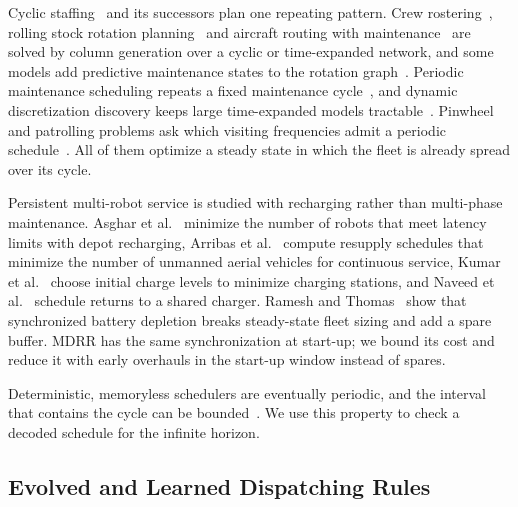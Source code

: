 Cyclic staffing~\cite{bartholdi1980cyclic} and its successors plan one repeating pattern.
Crew rostering~\cite{breugem2023threephase,feng2024branchprice}, rolling stock rotation planning~\cite{wang2024rollingstock} and aircraft routing with maintenance~\cite{he2023aircraft} are solved by column generation over a cyclic or time-expanded network, and some models add predictive maintenance states to the rotation graph~\cite{prause2024iterative}.
Periodic maintenance scheduling repeats a fixed maintenance cycle~\cite{maquirriain2024matheuristics}, and dynamic discretization discovery keeps large time-expanded models tractable~\cite{ojha2025crossdock}.
Pinwheel and patrolling problems ask which visiting frequencies admit a periodic schedule~\cite{kawamura2020patrolling,kawamura2026pinwheel}.
All of them optimize a steady state in which the fleet is already spread over its cycle.

Persistent multi-robot service is studied with recharging rather than multi-phase maintenance.
Asghar et al.~\cite{asghar2025multirobot} minimize the number of robots that meet latency limits with depot recharging, Arribas et al.~\cite{arribas2023uav} compute resupply schedules that minimize the number of unmanned aerial vehicles for continuous service, Kumar et al.~\cite{kumar2025persistent} choose initial charge levels to minimize charging stations, and Naveed et al.~\cite{naveed2025mesch} schedule returns to a shared charger.
Ramesh and Thomas~\cite{ramesh2026robust} show that synchronized battery depletion breaks steady-state fleet sizing and add a spare buffer.
MDRR has the same synchronization at start-up; we bound its cost and reduce it with early overhauls in the start-up window instead of spares.

Deterministic, memoryless schedulers are eventually periodic, and the interval that contains the cycle can be bounded~\cite{grolleau2013periodic,goossens2016periodicity}.
We use this property to check a decoded schedule for the infinite horizon.

\subsection{Evolved and Learned Dispatching Rules}

